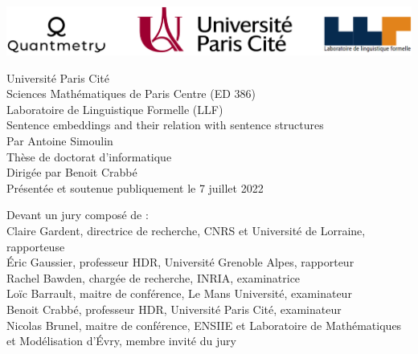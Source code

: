 \begin{titlepage}
\begin{center}
    {
    
    \includegraphics[width=14cm]{images/logos_3.png}
        
    \huge
    Université Paris Cité\\
    \large 
    Sciences Mathématiques de Paris Centre (ED 386)\\
    Laboratoire de Linguistique Formelle (LLF)\\[30pt]
    
    \Huge
    Sentence embeddings and their relation with sentence structures\\[56pt]
    
    \LARGE 
    \textmd{Par Antoine Simoulin\\[44pt]
    \Large
    Thèse de doctorat d’informatique\\[20pt]
    Dirigée par Benoit Crabbé \\[20pt]
    \large 
    Présentée et soutenue publiquement le 7 juillet 2022\\[20pt]}
    
    \vspace*{\fill}
    \raggedright\large 
    \textmd{Devant un jury composé de : \\[12pt]
    \normalsize
    Claire Gardent, directrice de recherche, CNRS et Université de Lorraine, rapporteuse\\
    Éric Gaussier, professeur HDR, Université Grenoble Alpes, rapporteur\\
    Rachel Bawden, chargée de recherche, INRIA, examinatrice\\
    Loïc Barrault, maitre de conférence, Le Mans Université, examinateur\\
    Benoit Crabbé, professeur HDR, Université Paris Cité, examinateur\\
    Nicolas Brunel, maitre de conférence, ENSIIE et Laboratoire de Mathématiques et Modélisation d'Évry, membre invité du jury\\}
}
\end{center}
\end{titlepage}